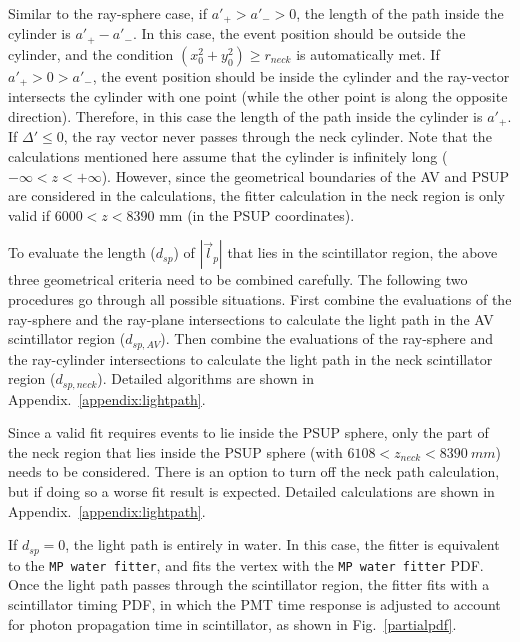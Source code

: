 \begin{itemize}
Similar to the ray-sphere case, if $a'_{+} > a'_{-} > 0$, the length of the path inside the cylinder is $a'_{+} - a'_{-}$. In this case, the event position should be outside the cylinder, and the condition $(x^2_0+y^2_0)\geq r_{neck}$ is automatically met. If $a'_+>0>a'_-$, the event position should be inside the cylinder and the ray-vector intersects the cylinder with one point (while the other point is along the opposite direction). Therefore, in this case the length of the path inside the cylinder is $a'_+$. If $\Delta'\leq0$, the ray vector never passes through the neck cylinder. Note that the calculations mentioned here assume that the cylinder is infinitely long ($-\infty<z<+\infty$). However, since the geometrical boundaries of the AV and PSUP are considered in the calculations, the fitter calculation in the neck region is only valid if $6000<z<8390$ mm (in the PSUP coordinates).

\end{itemize}

To evaluate the length ($d_{sp}$) of $|\vec{l}_p|$ that lies in the scintillator region, the above three geometrical criteria need to be combined carefully. The following two procedures go through all possible situations. First combine the evaluations of the ray-sphere and the ray-plane intersections to calculate the light path in the AV scintillator region ($d_{sp,AV}$). Then combine the evaluations of the ray-sphere and the ray-cylinder intersections to calculate the light path in the neck scintillator region ($d_{sp,neck}$). Detailed algorithms are shown in Appendix.~\ref{appendix:lightpath}.

Since a valid fit requires events to lie inside the PSUP sphere, only the part of the neck region that lies inside the PSUP sphere (with $6108<z_{neck}<8390~mm$) needs to be considered. There is an option to turn off the neck path calculation, but if doing so a worse fit result is expected. Detailed calculations are shown in Appendix.~\ref{appendix:lightpath}.

If $d_{sp}=0$, the light path is entirely in water. In this case, the fitter is equivalent to the \texttt{MP water fitter}, and fits the vertex with the \texttt{MP water fitter} PDF. Once the light path passes through the scintillator region, the fitter fits with a scintillator timing PDF, in which the PMT time response is adjusted to account for photon propagation time in scintillator, as shown in Fig.~\ref{partialpdf}.

